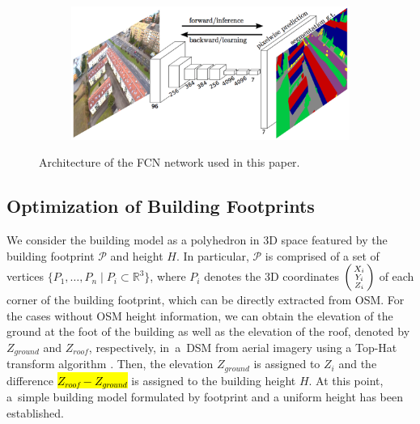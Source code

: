 \begin{figure}[H]
    \centering
       \begin{subfigure}[tbp]{0.9\columnwidth}
           \centering
           \includegraphics[width=\textwidth]{method/structure.png}
           
                    
       \end{subfigure}
       \caption{Architecture of the FCN network used in this paper.}
       \label{fig:archi}
\end{figure}



\subsection{Optimization of Building Footprints}

We consider the building model as a polyhedron in 3D space featured by the building footprint $\mathscr{P}$ and height $H$. In particular, $\mathscr{P}$ is comprised of a set of vertices $\{ P_{1},  \ldots ,  P_{n} \mid  P_{i} \subset \mathbb{R}^3 \}$, where $P_{i}$ denotes the 3D coordinates $\left(\begin{smallmatrix}X_{i}\\Y_{i}\\Z_{i}\end{smallmatrix}\right)$ of each corner of the building footprint, which can be directly extracted from OSM. For the cases without OSM height information, we can obtain the elevation of the ground at the foot of the building as well as the elevation of the roof, denoted by $Z_{ground}$ and $Z_{roof}$, respectively, in~a~DSM from aerial imagery using a Top-Hat transform algorithm \cite{shih2009image,Mongus2012tophat}. Then, the elevation $Z_{ground}$ is assigned to $Z_{i}$ and the difference \hl{$Z_{roof} - Z_{ground}$} is assigned to the building height $H$. At this point, a~simple building model formulated by footprint and a uniform height has been established.

%


